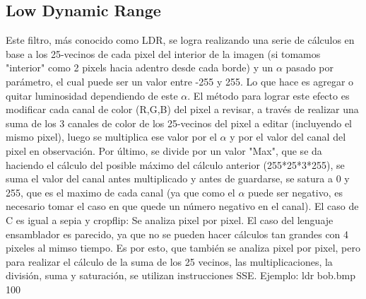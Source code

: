 \documentclass[a4paper]{article}
\begin{document}
\subsection{Low Dynamic Range}
Este filtro, más conocido como LDR, se logra realizando una serie de cálculos en base a los 25-vecinos de cada pixel del interior
de la imagen (si tomamos "interior" como 2 pixels hacia adentro desde cada borde) y un $\alpha$ pasado por parámetro, el cual puede ser
un valor entre -255 y 255. Lo que hace es agregar o quitar luminosidad dependiendo de este $\alpha$. El método para lograr este efecto es
modificar cada canal de color (R,G,B) del pixel a revisar, a través de realizar una suma de los 3 canales de color de los 25-vecinos del pixel a editar (incluyendo el mismo pixel),
luego se multiplica ese valor por el $\alpha$ y por el valor del canal del pixel en observación. Por último, se divide por un valor "Max",
que se da haciendo el cálculo del posible máximo del cálculo anterior (255*25*3*255), se suma el valor del canal antes multiplicado y antes
de guardarse, se satura a 0 y 255, que es el maximo de cada canal (ya que como el $\alpha$ puede ser negativo, es necesario tomar el caso
en que quede un número negativo en el canal).
\newline
El caso de C es igual a sepia y cropflip: Se analiza pixel por pixel. El caso del lenguaje ensamblador es parecido, ya que no se pueden
hacer cálculos tan grandes con 4 pixeles al mimso tiempo. Es por esto, que también se analiza pixel por pixel, pero para realizar el
cálculo de la suma de los 25 vecinos, las multiplicaciones, la división, suma y saturación, se utilizan instrucciones SSE.
\newline
Ejemplo: ldr bob.bmp 100
\end{document}
